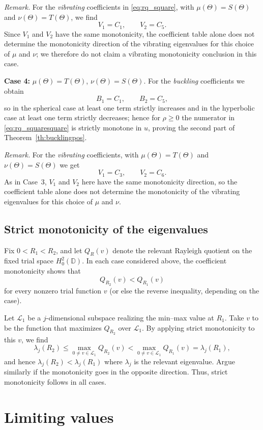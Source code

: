 \documentclass[11pt]{amsart}
\theoremstyle{definition}
\numberwithin{equation}{section}
\newcommand{\D}{\mathbb{D}}
\begin{document}
\noindent \emph{Remark.} For the \emph{vibrating} coefficients in \eqref{eq:rq_square}, with $\mu(\Theta) = S(\Theta)$ and $\nu(\Theta) = T(\Theta)$, we find
\[
V_1=C_1,\qquad V_2=C_5.
\]
Since $V_1$ and $V_2$ have the same monotonicity, the coefficient table alone does not determine the monotonicity direction of the vibrating eigenvalues for this choice of $\mu$ and $\nu$; we therefore do not claim a vibrating monotonicity conclusion in this case.

\medskip

\noindent\textbf{Case 4:} $\mu(\Theta)=T(\Theta)$, $\nu(\Theta)=S(\Theta)$.  
For the \emph{buckling} coefficients we obtain
\[
B_1=C_1,\qquad B_2=C_5,
\]
so in the spherical case at least one term strictly increases and in the hyperbolic case at least one term strictly decreases; hence for $\rho\ge 0$ the numerator in \eqref{eq:rq_squaresquare} is strictly monotone in $u$, proving the second part of Theorem~\ref{th:bucklingpos}.

\noindent \emph{Remark.} For the \emph{vibrating} coefficients, with $\mu(\Theta) = T(\Theta)$ and $\nu(\Theta) = S(\Theta)$ we get
\[
V_1=C_3,\qquad V_2=C_6.
\]
As in Case~3, $V_1$ and $V_2$ here have the same monotonicity direction, so the coefficient table alone does not determine the monotonicity of the vibrating eigenvalues for this choice of $\mu$ and $\nu$.

\subsection*{Strict monotonicity of the eigenvalues}
Fix $0<R_1<R_2$, and let $Q_R(v)$ denote the relevant Rayleigh quotient on the fixed
trial space $H_0^2(\D)$. In each case considered above, the coefficient monotonicity shows that
\[
Q_{R_2}(v)<Q_{R_1}(v)
\]
for every nonzero trial function $v$ (or else the reverse inequality, depending on
the case).

Let $\mathcal L_1$ be a
$j$-dimensional subspace realizing the min--max value at $R_1$. Take $v$ to be the function that maximizes $Q_{R_2}$ over $\mathcal{L}_1$. By applying strict monotonicity to this $v$, we find
\[
\lambda_j(R_2)\le \max_{0\neq v\in\mathcal L_1} Q_{R_2}(v)
< \max_{0\neq v\in\mathcal L_1} Q_{R_1}(v)
= \lambda_j(R_1),
\]
and hence $\lambda_j(R_2)<\lambda_j(R_1)$ where $\lambda_j$ is the relevant eigenvalue. Argue similarly if the monotonicity goes in the opposite direction. Thus, strict monotonicity follows in all cases.
\newpage


\section{Limiting values}
\end{document}
